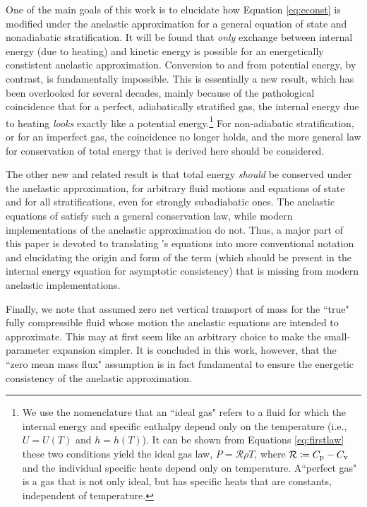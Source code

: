 \documentclass[12pt]{article}
\begin{document}
	One of the main goals of this work is to elucidate how Equation \eqref{eq:econst} is modified under the anelastic approximation for a general equation of state and nonadiabatic stratification. It will be found that \textit{only} exchange between internal energy (due to heating) and kinetic energy is possible for an energetically constistent anelastic approximation. Conversion to and from potential energy, by contrast, is fundamentally impossible. This is essentially a new result, which has been overlooked for several decades, mainly because of the pathological coincidence that for a perfect, adiabatically stratified gas, the internal energy due to heating \textit{looks} exactly like a potential energy.\footnote{We use the nomenclature that an ``ideal gas" refers to a fluid for which the internal energy and specific enthalpy depend only on the temperature (i.e., $U=U(T)$ and $h=h(T)$). It can be shown from Equations \eqref{eq:firstlaw} these two conditions yield the ideal gas law, $P=\mathcal{R}\rho T$, where $\mathcal{R}\coloneqq C_{\rm{p}}-C_{\rm{v}}$ and the individual specific heats depend only on temperature. A``perfect gas" is a gas that is not only ideal, but has specific heats that are constants, independent of temperature.} For non-adiabatic stratification, or for an imperfect gas, the coincidence no longer holds, and the more general law for conservation of total energy that is derived here should be considered. 
	
The other new and related result is that total energy \textit{should} be conserved under the anelastic approximation, for arbitrary fluid motions and equations of state and for all stratifications, even for strongly subadiabatic ones. The anelastic equations of \citet{Gough1969} satisfy such a general conservation law, while modern implementations of the anelastic approximation do not. Thus, a major part of this paper is devoted to translating \citet{Gough1969}'s equations into more conventional notation and elucidating the origin and form of the term (which should be present in the internal energy equation for asymptotic consistency) that is missing from modern anelastic implementations. 

Finally, we note that \citet{Gough1969} assumed zero net vertical transport of mass for the ``true" fully compressible fluid whose motion the anelastic equations are intended to approximate. This may at first seem like an arbitrary choice to make the small-parameter expansion simpler. It is concluded in this work, however, that the ``zero mean mass flux" assumption is in fact fundamental to ensure the energetic consistency of the anelastic approximation. 
\end{document}
